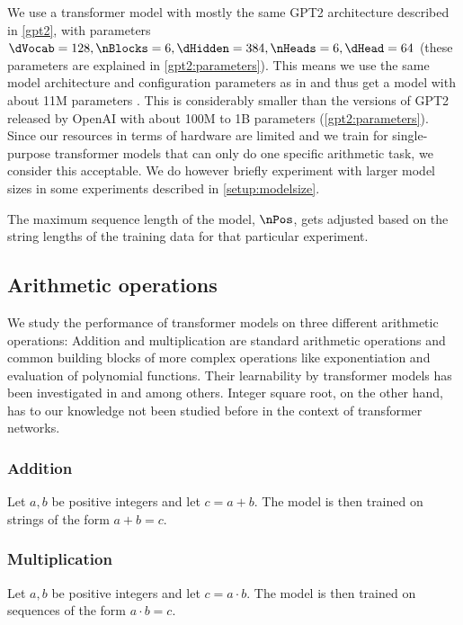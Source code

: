 We use a transformer model with mostly the same GPT2 architecture described in \cref{gpt2}, with parameters $\dVocab=128, \nBlocks=6, \dHidden=384, \nHeads=6, \dHead=64$ (these parameters are explained in \cref{gpt2:parameters}).
This means we use the same model architecture and configuration parameters as in \cite{teaching} and thus get a model with about 11M parameters . This is considerably smaller than the versions of GPT2 released by OpenAI with about 100M to 1B parameters (\cref{gpt2:parameters}).
Since our resources in terms of hardware are limited and we train for single-purpose transformer models that can only do one specific arithmetic task, we consider this acceptable.
We do however briefly experiment with larger model sizes in some experiments described in \cref{setup:modelsize}.

The maximum sequence length of the model, $\nPos$, gets adjusted based on the string lengths of the training data for that particular experiment.


\subsection{Arithmetic operations}
\label{methods:ops}

We study the performance of transformer models on three different arithmetic operations: Addition and multiplication are standard arithmetic operations and common building blocks of more complex operations like exponentiation and evaluation of polynomial functions. Their learnability by transformer models has been investigated in \cite{teaching} and \cite{visual} among others. Integer square root, on the other hand, has to our knowledge not been studied before in the context of transformer networks.

\subsubsection{Addition}
\label{methods:ops:add}

Let $a, b$ be positive integers and let $c=a+b$. The model is then trained on strings of the form $a+b=c$.


\subsubsection{Multiplication}
\label{methods:ops:mul}

Let $a, b$ be positive integers and let $c=a \cdot b$. The model is then trained on sequences of the form $a \cdot b=c$.

